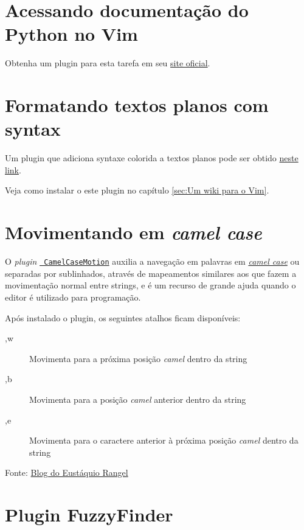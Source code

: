 \section{Acessando documentação do Python no Vim}
\label{Acessando documentação do Python no Vim}

 Obtenha um plugin para esta tarefa em seu 
 \href{http://www.vim.org/scripts/script.php?script\_id=910}{site oficial}.

\section{Formatando textos planos com syntax}
\label{Formatando textos planos com syntax}
Um plugin que adiciona syntaxe colorida a textos planos pode ser obtido
\href{http://www.vim.org/scripts/script.php?script\_id=2208&rating=helpful#1.3}{neste link}.

Veja como instalar o este plugin no capítulo \ref{sec:Um wiki para o Vim}.

\section{Movimentando em {\em camel case}}
\label{Movimentando em camel case}

O {\em plugin} \href{http://www.vim.org/scripts/script.php?script\_id=1905}{{\tt
CamelCaseMotion}} auxilia a navegação em palavras em
\href{http://en.wikipedia.org/wiki/Camel\_case}{{\em camel case}} ou separadas
por sublinhados, através de mapeamentos similares aos que fazem a movimentação
normal entre strings, e é um recurso de grande ajuda quando o editor é
utilizado para programação. 

Após instalado o plugin, os seguintes atalhos ficam disponíveis:
\begin{description}
 \item [,w] Movimenta para a próxima posição {\em camel} dentro da string
 \item [,b] Movimenta para a posição {\em camel} anterior dentro da string
 \item [,e] Movimenta para o caractere anterior à próxima posição {\em camel} dentro da string
\end{description}

Fonte: \href{http://eustaquiorangel.com/posts/522}{Blog do Eustáquio Rangel}

\section{Plugin FuzzyFinder}
\label{sec:Plugin FuzzyFinder}
                                                                       
